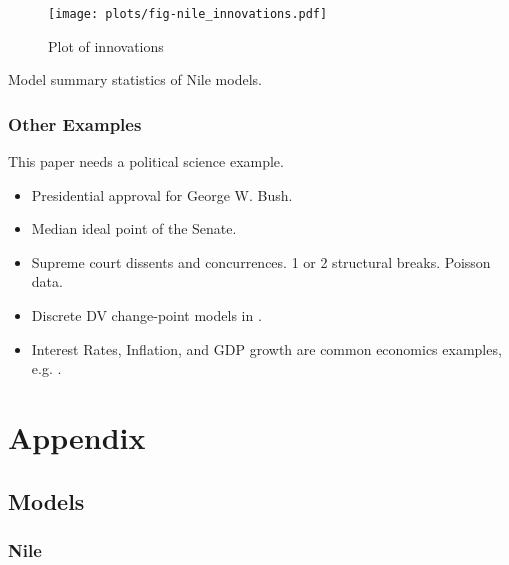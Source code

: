 \documentclass{article}
\begin{document}
\begin{figure}[htpb]
  \centering
  \texttt{[image: plots/fig-nile\_innovations.pdf]}
  \caption{Plot of innovations}
  \label{fig:nile_innovations}
\end{figure}

\begin{table}[htpb]
  \centering
  
  \caption{Model summary statistics of Nile models.}
  \label{tab:nile}
\end{table}

\clearpage{}

\subsubsection{Other Examples}

This paper needs a political science example.

\begin{itemize}
\item Presidential approval for George W. Bush. \parencites{RatkovicEng2010}
\item Median ideal point of the Senate. \parencites{RatkovicEng2010}
\item Supreme court dissents and concurrences. 1 or 2 structural breaks. Poisson data. \parencite{CalderiaZorn1998}
\item Discrete DV change-point models in \parencite{spirling2007bayesian}.
\item Interest Rates, Inflation, and GDP growth are common economics examples, e.g. \textcite{GiordaniKohn2008}.
\end{itemize}

\section{Appendix}
\label{sec:appendix}


\subsection{Models}
\label{sec:models}

\subsubsection{Nile}
\label{sec:nile-1}
\end{document}

